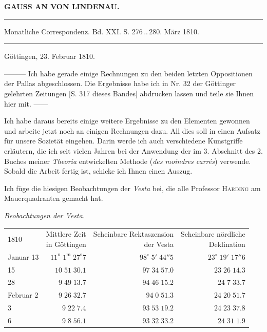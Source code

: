 \clearpage{}

\begin{center}\textbf{GAUSS AN VON LINDENAU.}\par\vspace{4pt}\hrule\vspace{4pt}\fontsize{10}{12}\selectfont Monatliche Correspondenz. Bd. XXI. S. 276\,..\,280. März 1810.\par\vspace{4pt}\hrule\vspace{4pt}\end{center}
\begin{flushright}Göttingen, 23. Februar 1810.\end{flushright}

\par\indent ---\enspace---\enspace--- Ich habe gerade einige Rechnungen zu den beiden letzten Oppositionen der Pallas abgeschlossen. Die Ergebnisse habe ich in Nr. 32 der Göttinger gelehrten Zeitungen [S. 317 dieses Bandes] abdrucken lassen und teile sie Ihnen hier mit. ---\enspace---

Ich habe daraus bereits einige weitere Ergebnisse zu den Elementen gewonnen und arbeite jetzt noch an einigen Rechnungen dazu. All dies soll in einen Aufsatz für unsere Sozietät eingehen. Darin werde ich auch verschiedene Kunstgriffe erläutern, die ich seit vielen Jahren bei der Anwendung der im 3. Abschnitt des 2. Buches meiner \emph{Theoria} entwickelten Methode (\emph{des moindres carrés}) verwende. Sobald die Arbeit fertig ist, schicke ich Ihnen einen Auszug.

Ich füge die hiesigen Beobachtungen der \emph{Vesta} bei, die alle Professor \textsc{Harding} am Mauerquadranten gemacht hat.

\begin{center}\emph{Beobachtungen der Vesta.}\end{center}
\begin{center}\fontsize{10}{12}\selectfont\setlength{\tabcolsep}{5pt}\renewcommand{\arraystretch}{1.15}\begin{tabular}{lrrr}
1810 & \shortstack{Mittlere Zeit\\in Göttingen} & \shortstack{Scheinbare Rektaszension\\der Vesta} & \shortstack{Scheinbare nördliche\\Deklination}\\
Januar 13 & $11^{\text{u}}\;1^{\text{m}}\;27^{\text{s}}7$ & $98^\circ\;5'\;44''5$ & $23^\circ\;19'\;17''6$\\
15 & $10\;51\;30.1$ & $97\;34\;57.0$ & $23\;26\;14.3$\\
28 & $9\;49\;13.7$ & $94\;46\;15.2$ & $24\;7\;33.7$\\
Februar 2 & $9\;26\;32.7$ & $94\;0\;51.3$ & $24\;20\;51.7$\\
3 & $9\;22\;7.4$ & $93\;53\;19.2$ & $24\;23\;37.8$\\
6 & $9\;8\;56.1$ & $93\;32\;33.2$ & $24\;31\;1.9$\\
\end{tabular}\end{center}

